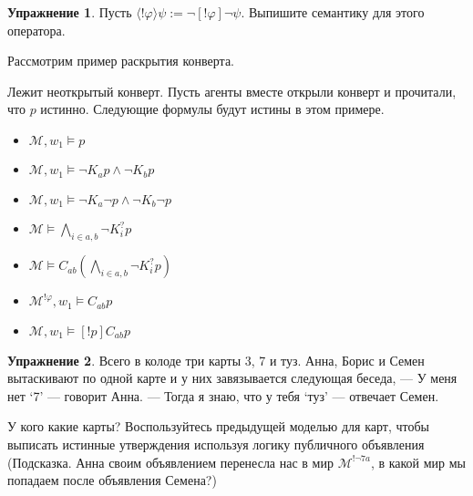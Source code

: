 \documentclass[openany]{book}
\theoremstyle{plain}
\theoremstyle{definition}
\newtheorem{xrc}{Упражнение}[]
\begin{document}
\begin{xrc}
    Пусть \(\langle ! \varphi \rangle \psi := \neg [!\varphi] \neg \psi\). Выпишите семантику для этого оператора.
\end{xrc}

Рассмотрим пример раскрытия конверта.

\begin{figure}[H]
    \centering
\end{figure}

Лежит неоткрытый конверт. Пусть агенты вместе открыли конверт и прочитали, что \(p\) истинно. Следующие формулы будут истины в этом примере. 
\begin{itemize}
    \item \(\mathcal{M}, w_1 \models p\)
    \item \(\mathcal{M}, w_1 \models \neg K_a p \land \neg K_b p\)
    \item \(\mathcal{M}, w_1 \models \neg K_a \neg p \land \neg K_b \neg p\)
    \item \(\mathcal{M} \models \bigwedge\limits_{i\in{a,b}} \neg K_i^? p\)
    \item \(\mathcal{M} \models C_{ab} \left(\bigwedge\limits_{i \in {a,b}} \neg K_i^? p \right)\)
    \item \(\mathcal{M}^{!\varphi}, w_1 \models C_{ab} p\)
    \item \(\mathcal{M}, w_1 \models [!p] C_{ab} p\)
\end{itemize}

\begin{xrc}
    Всего в колоде три карты 3, 7 и туз. Анна, Борис и Семен вытаскивают по одной карте и у них завязывается следующая беседа,
    --- У меня нет `7' --- говорит Анна.
    --- Тогда я знаю, что у тебя `туз' --- отвечает Семен.

    У кого какие карты? Воспользуйтесь предыдущей моделью для карт, чтобы выписать истинные утверждения используя логику публичного объявления (Подсказка. Анна своим объявлением перенесла нас в мир \(\mathcal{M}^{! \neg 7a}\), в какой мир мы попадаем после объявления Семена?)
\end{xrc}
\end{document}
